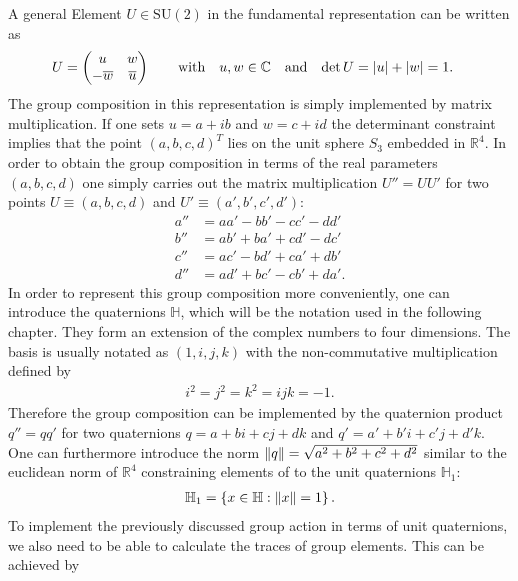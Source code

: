 A general Element $U \in \mathrm{SU}(2)$ in the fundamental representation can be written as
\begin{align}
 U & =
 \begin{pmatrix}
  u             & w            \\
  -\overline{w} & \overline{u}
 \end{pmatrix} \qquad \textrm{with} \quad u,w \in \mathbb{C} \quad \textrm{and} \quad \mathrm{det} \, U = \abs{u} + \abs{w} = 1 \textrm{.}
 \label{eq:generalSu2Element}
\end{align}
The group composition in this representation is simply implemented by matrix multiplication. If one sets $u = a + ib$ and $w = c + id$ the determinant constraint implies that the point $(a,b,c,d)^T$ lies on the unit sphere $S_3$ embedded in $\mathbb{R}^4$. In order to obtain the group composition in terms of the real parameters $(a,b,c,d)$ one simply carries out the matrix multiplication $U'' = U U'$ for two points $U \equiv (a,b,c,d)$ and $U' \equiv (a',b',c',d')$:
\begin{align*}
 a'' & = a a' - b b' - c c' - d d'            \\
 b'' & = a b' + b a' + c d' - d c'            \\
 c'' & = a c' - b d' + c a' + d b'            \\
 d'' & = a d' + b c' - c b' + d a' \textrm{.}
\end{align*}
In order to represent this group composition more conveniently, one can introduce the quaternions $\mathbb{H}$, which will be the notation used in the following chapter. They form an extension of the complex numbers to four dimensions. The basis is usually notated as $(1,i,j,k)$ with the non-commutative multiplication defined by
\begin{align*}
 i^2 = j^2 = k^2 = ijk = -1 \textrm{.}
\end{align*}
Therefore the group composition can be implemented by the quaternion product $q'' = q q'$ for two quaternions $q = a + bi + cj + dk$ and $q' = a' + b'i + c'j + d'k$. One can furthermore introduce the norm $\norm{q} = \sqrt{a^2 + b^2 + c^2 +d^2}$ similar to the euclidean norm of $\mathbb{R}^4$ constraining elements of \SUTwo to the unit quaternions $\mathbb{H}_1$:
\begin{align*}
 \mathbb{H}_1 = \left\{ x \in \mathbb{H} : \norm{x} = 1\right\} \textrm{.}
\end{align*}
To implement the previously discussed group action in terms of unit quaternions, we also need to be able to calculate the traces of group elements. This can be achieved by
